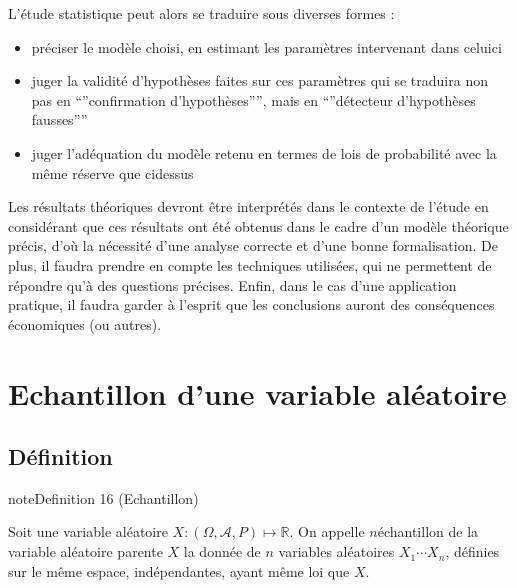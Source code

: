 \documentclass[letterpaper,10pt,french]{sphinxmanual}
\begin{document}
\sphinxAtStartPar
L’étude statistique peut alors se traduire sous diverses formes :
\begin{itemize}
\item {} 
\sphinxAtStartPar
préciser le modèle choisi, en estimant les paramètres intervenant dans celui\sphinxhyphen{}ci

\item {} 
\sphinxAtStartPar
juger la validité d’hypothèses faites sur ces paramètres qui se traduira non pas en “”confirmation d’hypothèses””, mais en “”détecteur d’hypothèses fausses””

\item {} 
\sphinxAtStartPar
juger l’adéquation du modèle retenu en termes de lois de probabilité avec la même réserve que ci\sphinxhyphen{}dessus

\end{itemize}

\sphinxAtStartPar
Les résultats théoriques devront être interprétés dans le contexte de l’étude en considérant que ces résultats ont été obtenus dans le cadre d’un modèle théorique précis, d’où la nécessité d’une analyse correcte et d’une bonne formalisation. De plus, il faudra prendre en compte les techniques utilisées, qui ne permettent de répondre qu’à des questions précises. Enfin, dans le cas d’une application pratique, il faudra garder à l’esprit que les conclusions auront des conséquences économiques (ou autres).


\section{Echantillon d’une variable aléatoire}
\label{\detokenize{elemstats:echantillon-d-une-variable-aleatoire}}

\subsection{Définition}
\label{\detokenize{elemstats:definition}}\label{elemstats:definition-0}
\begin{sphinxadmonition}{note}{Definition 16 (Echantillon)}



\sphinxAtStartPar
Soit une variable aléatoire \(X:(\Omega,\mathcal A,P)\mapsto \mathbb{R}\). On appelle \(n\)\sphinxhyphen{}échantillon de la variable aléatoire parente \(X\) la donnée de \(n\) variables aléatoires \(X_1\cdots X_n\), définies sur le même espace, indépendantes, ayant même loi que \(X\).
\end{sphinxadmonition}
\end{document}

